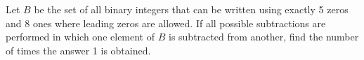 Let $B$ be the set of all binary integers that can be written using exactly 5 zeros and 8 ones where leading zeros are allowed. If all possible subtractions are performed in which one element of $B$ is subtracted from another, find the number of times the answer 1 is obtained.